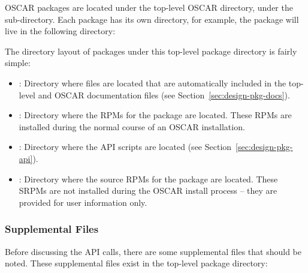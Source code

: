 OSCAR packages are located under the top-level OSCAR directory, under
the  sub-directory.  Each package has its own
directory, for example, the  package will live in the
following directory:

\vspace{10pt}
\centerline{}
\vspace{10pt}

The directory layout of packages under this top-level package
directory is fairly simple:

\begin{itemize}
\item {}: Directory where files are located that are
  automatically included in the top-level  and
   OSCAR documentation files (see
  Section~\ref{sec:design-pkg-docs}).
  
\item {}: Directory where the RPMs for the package are
  located.  These RPMs are installed during the normal course of an
  OSCAR installation.

\item {}: Directory where the API scripts are located
  (see Section~\ref{sec:design-pkg-api}).
  
\item {}: Directory where the source RPMs for the
  package are located.  These SRPMs are not installed during the OSCAR
  install process -- they are provided for user information only.
\end{itemize}


\subsubsection{Supplemental Files}

Before discussing the API calls, there are some supplemental files
that should be noted.  These supplemental files exist in the top-level
package directory:

